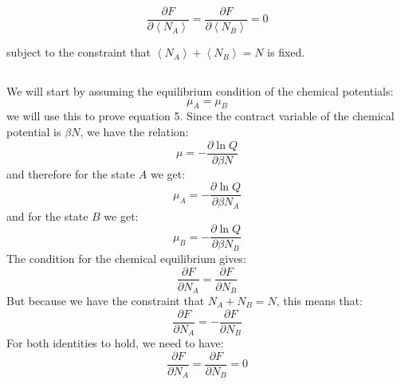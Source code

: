 \documentclass[12pt]{article}
\begin{document}
\begin{equation*}
\frac{\partial F}{\partial\left\langle N_{A}\right\rangle}=\frac{\partial F}{\partial\left\langle N_{B}\right\rangle}=0 \tag{5}
\end{equation*}


subject to the constraint that $\left\langle N_{A}\right\rangle+\left\langle N_{B}\right\rangle=N$ is fixed.
\subsection{}
We will start by assuming the equilibrium condition of the chemical potentials:
\begin{equation}
\mu_A = \mu_B
\end{equation}
we will use this to prove equation 5.
Since the contract variable of the chemical potential is $\beta N$, we have the relation:
\begin{equation}
\mu = -\frac{\partial \ln Q}{\partial \beta N}
\end{equation}
and therefore for the state $A$ we get:
\begin{equation}
\mu_A = -\frac{\partial \ln Q}{\partial \beta N_A}
\end{equation}
and for the state $B$ we get:
\begin{equation}
\mu_B = -\frac{\partial \ln Q}{\partial \beta N_B}
\end{equation}
The condition for the chemical equilibrium gives:
\begin{equation}
\frac{\partial F }{\partial N_A} = \frac{\partial F }{\partial N_B}
\end{equation}
But because we have the constraint that $N_A + N_B = N$, this means that:
\begin{equation}
\frac{\partial F }{\partial N_A} = -\frac{\partial F }{\partial N_B}
\end{equation}
For both identities to hold, we need to have:
\begin{equation}
\frac{\partial F }{\partial N_A} = \frac{\partial F }{\partial N_B} = 0
\end{equation}
\end{document}
